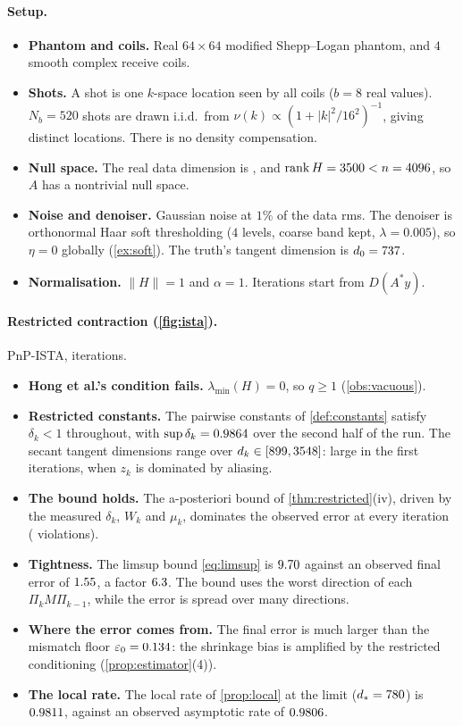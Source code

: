 \documentclass[11pt]{article}
\theoremstyle{definition}
\theoremstyle{remark}
\newcommand{\norm}[1]{\lVert #1\rVert}
\newcommand{\lmin}{\lambda_{\min}}
\begin{document}
\paragraph{Setup.}
\begin{itemize}
\item \textbf{Phantom and coils.} Real $64\times64$ modified Shepp--Logan phantom, and $4$ smooth complex receive
  coils.
\item \textbf{Shots.} A shot is one $k$-space location seen by all coils ($b=8$ real values). $N_b=520$ shots are
  drawn i.i.d.\ from $\nu(k)\propto(1+|k|^2/16^2)^{-1}$, giving \EXPdistinct{} distinct locations. There is no density
  compensation.
\item \textbf{Null space.} The real data dimension is \EXPrealdim{}, and $\operatorname{rank}H=3500<n=4096$, so
  $A$ has a nontrivial null space.
\item \textbf{Noise and denoiser.} Gaussian noise at $1\%$ of the data rms. The denoiser is orthonormal Haar
  soft thresholding ($4$ levels, coarse band kept, $\lambda=0.005$), so $\eta=0$ globally (\cref{ex:soft}). The
  truth's tangent dimension is $d_0=737$.
\item \textbf{Normalisation.} $\norm H=1$ and $\alpha=1$. Iterations start from $D(A^*y)$.
\end{itemize}

\paragraph{Restricted contraction (\cref{fig:ista}).} PnP-ISTA, \EXPiters{} iterations.
\begin{itemize}
\item \textbf{Hong et al.'s condition fails.} $\lmin(H)=0$, so $q\geq1$ (\cref{obs:vacuous}).
\item \textbf{Restricted constants.} The pairwise constants of \cref{def:constants} satisfy $\delta_k<1$ throughout,
  with $\sup\delta_k=0.9864$ over the second half of the run. The secant tangent dimensions range over
  $d_k\in[899,3548]$: large in the first iterations, when $z_k$ is dominated by aliasing.
\item \textbf{The bound holds.} The a-posteriori bound of \cref{thm:restricted}(iv), driven by the measured
  $\delta_k$, $W_k$ and $\mu_k$, dominates the observed error at every iteration (\EXPboundviol{} violations).
\item \textbf{Tightness.} The limsup bound \eqref{eq:limsup} is $9.70$ against an observed final error of
  $1.55$, a factor $6.3$. The bound uses the worst direction of each $\Pi_kM\Pi_{k-1}$, while the error
  is spread over many directions.
\item \textbf{Where the error comes from.} The final error is much larger than the mismatch floor
  $\varepsilon_0=0.134$: the shrinkage bias is amplified by the restricted conditioning
  (\cref{prop:estimator}(4)).
\item \textbf{The local rate.} The local rate of \cref{prop:local} at the limit ($d_*=780$) is $0.9811$,
  against an observed asymptotic rate of $0.9806$.
\end{itemize}
\end{document}
